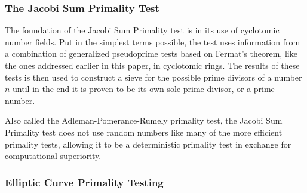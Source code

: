 \documentclass{article}
\begin{document}
\subsubsection*{The Jacobi Sum Primality Test}

\par The foundation of the Jacobi Sum Primality test is in its use of cyclotomic number fields. Put in the simplest terms possible, the test uses information from a combination of generalized pseudoprime tests based on Fermat's theorem, like the ones addressed earlier in this paper, in cyclotomic rings. The results of these tests is then used to construct a sieve for the possible prime divisors of a number $n$ until in the end it is proven to be its own sole prime divisor, or a prime number. 

 \par Also called the Adleman-Pomerance-Rumely primality test,  the Jacobi Sum Primality test does not use random numbers like many of the more efficient primality tests, allowing it to be a deterministic primality test in exchange for computational superiority.

\subsubsection*{Elliptic Curve Primality Testing}
\end{document}
